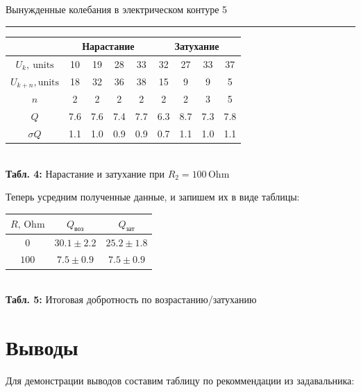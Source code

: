 \documentclass[12pt,a4paper]{scrartcl}
\begin{document}
	\newpage
	
	
	\begin{flushleft}
		\footnotesize{Вынужденные колебания в электрическом контуре} \hspace{\fill} \footnotesize{5}
		\\[-0.3cm]\noindent\rule{\textwidth}{0.3pt}
	\end{flushleft}
	
	\begin{center}
		\begin{tabular}{|c|c|c|c|c|c|c|c|c|}  \hline
			{} & \multicolumn{4}{|c|}{Нарастание} & \multicolumn{4}{|c|}{Затухание} \\\hline
			$U_k,\ \text{units}$ & 10 & 19 & 28 & 33 & 32 & 27 & 33 & 37 \\\hline
			$U_{k+n}, \text{units}$ & 18 & 32 & 36 & 38 & 15 & 9 & 9 & 5 \\\hline
			$n$ & 2 & 2 & 2 & 2 & 2 & 2 & 3 & 5 \\\hline
			$Q$ & 7.6 & 7.6 & 7.4 & 7.7 & 6.3 & 8.7 & 7.3 & 7.8 \\\hline
			$\sigma Q$ & 1.1 & 1.0 & 0.9 & 0.9 & 0.7 & 1.1 & 1.0 & 1.1 \\\hline
		\end{tabular}
		\\\textbf{Табл. 4:} Нарастание и затухание при $R_2 = 100\, \mathrm{Ohm}$
	\end{center}

	Теперь усредним полученные данные, и запишем их в виде таблицы:
	
	\begin{center}
		\begin{tabular}{|c|c|c|} \hline
			$R,\, \mathrm{Ohm}$ & $Q_\text{воз}$ & $Q_\text{зат}$ \\\hline
			$0$ & $30.1 \pm 2.2$ & $25.2 \pm 1.8$ \\\hline
			$100$ & $7.5 \pm 0.9$ & $7.5 \pm 0.9$ \\\hline 
		\end{tabular}
		\\\textbf{Табл. 5:} Итоговая добротность по возрастанию/затуханию
	\end{center}
	
	\section{Выводы}
	
	Для демонстрации выводов составим таблицу по рекоммендации из задавальника:
	
\end{document}
